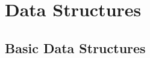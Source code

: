 









\chapter{Data Structures}
\label{chp:DataStructures}





\section{Basic Data Structures}
\label{sec:BasicDataStructures}

